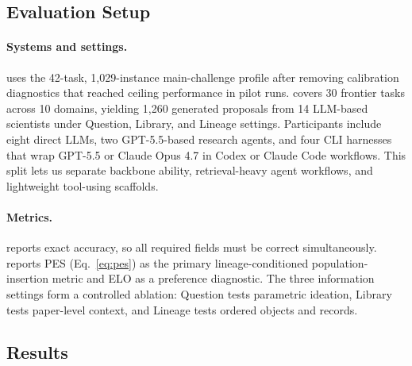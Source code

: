 \subsection{Evaluation Setup}


\paragraph{Systems and settings.}
\geneexam{} uses the 42-task, 1,029-instance main-challenge profile after removing calibration diagnostics that reached ceiling performance in pilot runs. \genearena{} covers 30 frontier tasks across 10 domains, yielding 1,260 generated proposals from 14 LLM-based scientists under Question, Library, and Lineage settings. Participants include eight direct LLMs, two GPT-5.5-based research agents, and four CLI harnesses that wrap GPT-5.5 or Claude Opus 4.7 in Codex or Claude Code workflows. This split lets us separate backbone ability, retrieval-heavy agent workflows, and lightweight tool-using scaffolds.

\paragraph{Metrics.}
\geneexam{} reports exact accuracy, so all required fields must be correct simultaneously. \genearena{} reports PES (Eq.~\ref{eq:pes}) as the primary lineage-conditioned population-insertion metric and ELO as a preference diagnostic. The three information settings form a controlled ablation: Question tests parametric ideation, Library tests paper-level context, and Lineage tests ordered \genome{} objects and \genomediff{} records.

\subsection{\geneexam{} Results}

